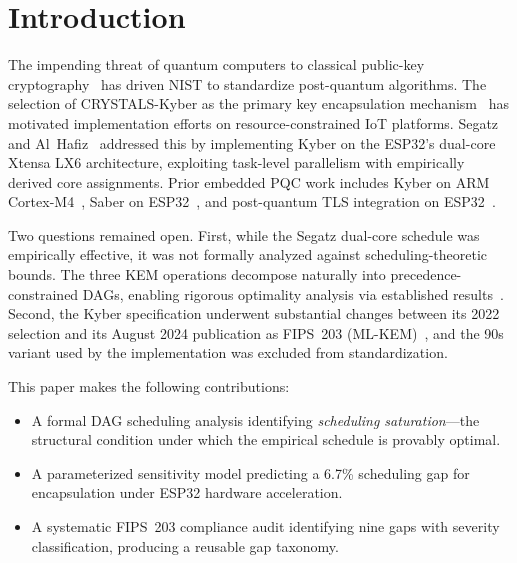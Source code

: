 \documentclass[conference]{IEEEtran}
\begin{document}
\IEEEpeerreviewmaketitle

\section{Introduction}

The impending threat of quantum computers to classical public-key cryptography~\cite{shor1999} has driven NIST to standardize post-quantum algorithms. The selection of CRYSTALS-Kyber as the primary key encapsulation mechanism~\cite{kyber2021, nist2022announce} has motivated implementation efforts on resource-constrained IoT platforms. Segatz and Al~Hafiz~\cite{segatz2022} addressed this by implementing Kyber on the ESP32's dual-core Xtensa LX6 architecture, exploiting task-level parallelism with empirically derived core assignments. Prior embedded PQC work includes Kyber on ARM Cortex-M4~\cite{botros2019}, Saber on ESP32~\cite{wang2020}, and post-quantum TLS integration on ESP32~\cite{buerstinghaus2020}.

Two questions remained open. First, while the Segatz dual-core schedule was empirically effective, it was not formally analyzed against scheduling-theoretic bounds. The three KEM operations decompose naturally into precedence-constrained DAGs, enabling rigorous optimality analysis via established results~\cite{graham1969, kwok1999}. Second, the Kyber specification underwent substantial changes between its 2022 selection and its August 2024 publication as FIPS~203 (ML-KEM)~\cite{fips203}, and the 90s variant used by the implementation was excluded from standardization.

This paper makes the following contributions:
\begin{itemize}
\item A formal DAG scheduling analysis identifying \emph{scheduling saturation}---the structural condition under which the empirical schedule is provably optimal.
\item A parameterized sensitivity model predicting a 6.7\% scheduling gap for encapsulation under ESP32 hardware acceleration.
\item A systematic FIPS~203 compliance audit identifying nine gaps with severity classification, producing a reusable gap taxonomy.
\end{itemize}

\end{document}
